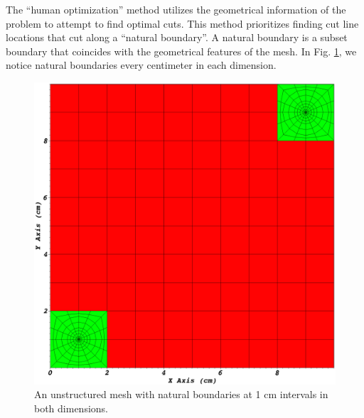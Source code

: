   The ``human optimization'' method utilizes the geometrical information of the problem to attempt to find optimal cuts. This method prioritizes finding cut line locations that cut along a ``natural boundary''. A natural boundary is a subset boundary that coincides with the geometrical features of the mesh. In Fig. \ref{partitioning_example}, we notice natural boundaries every centimeter in each dimension. 
 \begin{figure}[H]
\centering
\includegraphics[scale=0.2]{../figures/spiderweb_10x10_sparse.png}
\caption{An unstructured mesh with natural boundaries at 1 cm intervals in both dimensions.}
\label{partitioning_example}
\end{figure}

